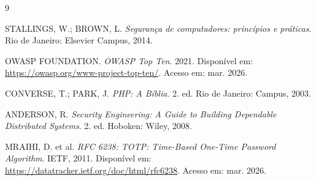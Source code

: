 \documentclass[12pt,a4paper]{article}
\begin{document}
\begin{thebibliography}{9}

   STALLINGS, W.; BROWN, L. \textit{Segurança de computadores: princípios e práticas}. Rio de Janeiro: Elsevier Campus, 2014.

   OWASP FOUNDATION. \textit{OWASP Top Ten}. 2021. Disponível em: \url{https://owasp.org/www-project-top-ten/}. Acesso em: mar. 2026.

   CONVERSE, T.; PARK, J. \textit{PHP: A Bíblia}. 2. ed. Rio de Janeiro: Campus, 2003.

   ANDERSON, R. \textit{Security Engineering: A Guide to Building Dependable Distributed Systems}. 2. ed. Hoboken: Wiley, 2008.

   MRAIHI, D. et al. \textit{RFC 6238: TOTP: Time-Based One-Time Password Algorithm}. IETF, 2011. Disponível em: \url{https://datatracker.ietf.org/doc/html/rfc6238}. Acesso em: mar. 2026.

\end{thebibliography}
\end{document}
